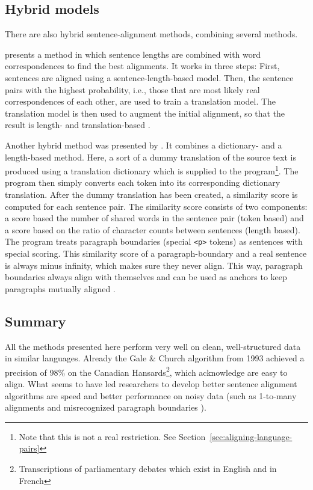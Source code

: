 \subsection{Hybrid models}
\label{sec:hybrid-models}
There are also hybrid sentence-alignment methods, combining several methods.


\cite{moore2002fast} presents a method in which sentence lengths are combined with word correspondences to find the best alignments. 
It works in three steps:
First, sentences are aligned using a sentence-length-based model. 
Then, the sentence pairs with the highest probability, i.e., those that are most likely real correspondences of each other, are used to train a translation model. 
The translation model is then used to augment the initial alignment, so that the result is length- and translation-based \autocite{moore2002fast}.

Another hybrid method was presented by \cite{hunalign}. 
It combines a dictionary- and a length-based method.
Here, a sort of a dummy translation of the source text is produced using a translation dictionary which is supplied to the program\footnote{Note that this is not a real restriction. See Section~\ref{sec:aligning-language-pairs}}. 
The program then simply converts each token into its corresponding dictionary translation.
After the dummy translation has been created, a similarity score is computed for each sentence pair.
The similarity score consists of two components: a score based the number of shared words in the sentence pair (token based) and  a score based on the ratio of character counts between sentences (length based). 
The program treats paragraph boundaries (special \texttt{<p>} tokens) as sentences with special scoring. 
This similarity score of a paragraph-boundary  and a real sentence is always minus infinity, which makes sure they never align. This way, paragraph boundaries always align with themselves and can be used as anchors to keep  paragraphs mutually aligned \autocite{hunalign}.

\subsection{Summary}
All the methods presented here perform very well on clean, well-structured data in similar languages. Already the Gale \& Church algorithm from 1993 achieved a precision of 98\% on the Canadian Hansards\footnote{Transcriptions of parliamentary debates which exist in English and in French}, which \citeauthor{gale-church-1991-program} acknowledge are easy to align. 
What seems to have led researchers to develop better sentence alignment algorithms are speed \autocites{chen-1993-aligning,hunalign} and better performance on noisy data (such as 1-to-many alignments and misrecognized paragraph boundaries \autocite{sennrich-volk-2010-mt}). 

